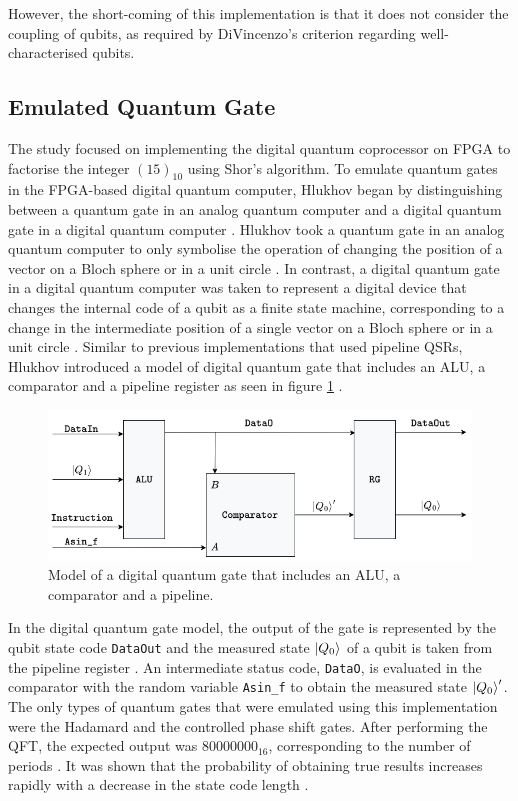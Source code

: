 However, the short-coming of this implementation is that it does not consider the coupling of qubits, as required by DiVincenzo's criterion regarding well-characterised qubits. 

\subsection{Emulated Quantum Gate }
 
The study focused on implementing the digital quantum coprocessor on FPGA to factorise the integer $(15)_{10}$ using Shor's algorithm. To emulate quantum gates in the FPGA-based digital quantum computer, Hlukhov began by distinguishing between a quantum gate in an analog quantum computer and a digital quantum gate in a digital quantum computer \cite{hlukhov}. Hlukhov took a quantum gate in an analog quantum computer to only symbolise the operation of changing the position of a vector on a Bloch sphere or in a unit circle \cite{Hlukhov2021}. In contrast, a digital quantum gate in a digital quantum computer was taken to represent a digital device that changes the internal code of a qubit as a finite state machine, corresponding to a change in the intermediate position of a single vector on a Bloch sphere or in a unit circle \cite{Hlukhov2021}. Similar to previous implementations that used pipeline QSRs, Hlukhov introduced a model of digital quantum gate that includes an ALU, a comparator and a pipeline register as seen in figure \ref{fig:hlukhov-qgate} \cite{Hlukhov2021}. 

\begin{figure}[!ht]
	\centering
	\includegraphics[width=1.0\linewidth]{body/ch3/figs/hlukhov-qgate}
	\caption[Proposed Quantum Gate by Hlukhov.]{Model of a digital quantum gate that includes an ALU, a comparator and a pipeline.}
	\label{fig:hlukhov-qgate}
\end{figure}

In the digital quantum gate model, the output of the gate is represented by the qubit state code \texttt{DataOut} and the measured state $\ket{Q_0}$ of a qubit is taken from the pipeline register \cite{Hlukhov2021}. An intermediate status code, \texttt{DataO}, is evaluated in the comparator with the random variable \texttt{Asin\_f} to obtain the measured state $\ket{Q_0}'$. The only types of quantum gates that were emulated using this implementation were the Hadamard and the controlled phase shift gates. After performing the QFT, the expected output was $80000000_{16}$, corresponding to the number of periods \cite{Hlukhov2021}. It was shown that the probability of obtaining true results increases rapidly with a decrease in the state code length \cite{hlukhov2021digital}. 

